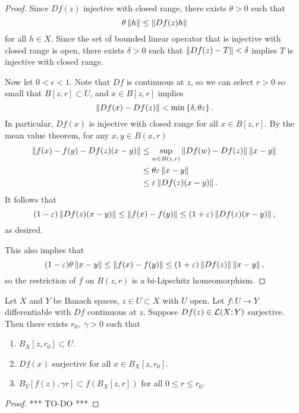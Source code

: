 \documentclass[a4paper]{article}
\begin{document}
\begin{proof}

Since $Df(z)$ injective with closed range, there exists 
$\theta > 0$ such that 
\[
\theta \left\lVert h\right\rVert \leq \left\lVert Df(z) h\right\rVert
\]
for all $h \in X$. Since the set of bounded linear operator 
that is injective with closed range is open, there exists 
$\delta > 0$ such that $\left\lVert Df(z) - T\right\rVert < \delta$ implies 
$T$ is injective with closed range. 

Now let $0 < \epsilon < 1$. Note that $Df$ 
is continuous at $z$, so we can select $r > 0$ so small 
that $B[z, r] \subset U$, and $x \in B[z, r]$ implies 
\[
\left\lVert Df(x) - Df(z)\right\rVert < \min \left\{ \delta, \theta \varepsilon \right\}.
\]
In particular, $Df(x)$ is injective with closed range 
for all $x \in B[z, r]$. By the mean value theorem, 
for any $x, y \in B(x, r)$
\[
\begin{aligned}
\left\lVert f(x) - f(y) - Df(z) (x - y)\right\rVert 
&\leq \sup_{w \in B(z, r)} \left\lVert Df(w) - Df(z)\right\rVert \left\lVert x - y\right\rVert \\
&\leq \theta \varepsilon \left\lVert x - y\right\rVert \\ 
&\leq \varepsilon \left\lVert Df(z) (x - y)\right\rVert.
\end{aligned}
\]
It follows that 
\[
(1 - \varepsilon) \left\lVert Df(z)(x - y)\right\rVert 
\leq \left\lVert f(x) - f(y)\right\rVert 
\leq (1 + \varepsilon) \left\lVert Df(z) (x - y)\right\rVert,
\]
as desired.

This also implies that 
\[
(1 - \varepsilon) \theta \left\lVert x - y\right\rVert 
\leq \left\lVert f(x) - f(y)\right\rVert \leq (1 + \varepsilon)
\left\lVert Df(z)\right\rVert \left\lVert x - y\right\rVert,
\]
so the restriction of $f$ on $B(z, r)$ is a bi-Lipschitz 
homeomorphism.

\end{proof}

\begin{thm}
Let $X$ and $Y$ be Banach spaces, $z \in U \subset X$ with 
$U$ open. Let $f: U \to Y$ differentiable with 
$Df$ continuous at $z$. Suppose $Df(z) \in \mathcal{L}(X; Y)$ 
surjective. Then there exists $r_0, \; \gamma > 0$ such that 
\begin{enumerate}
  \item $B_X[z, r_0] \subset U$. 
  \item $Df(x)$ surjective for all $x \in B_X[z, r_0]$. 
  \item $B_Y[f(z), \gamma r] \subset f(B_X[z, r])$ for all 
  $0 \leq r \leq r_0$.
\end{enumerate}
\end{thm}

\begin{proof}
  
*** TO-DO ***

\end{proof}
\end{document}
